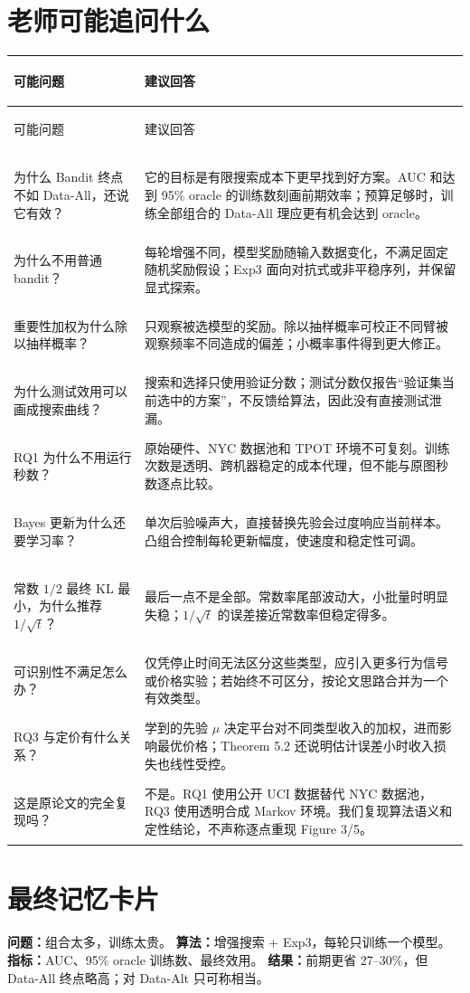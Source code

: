 \documentclass[11pt,a4paper]{ctexart}
\begin{document}
\section{老师可能追问什么}
\begin{longtable}{>{\bfseries\raggedright\arraybackslash}p{}>{\raggedright\arraybackslash}p{}}
\toprule
可能问题 & 建议回答\\
\midrule
\endfirsthead
\toprule
可能问题 & 建议回答\\
\midrule
\endhead
为什么 Bandit 终点不如 Data-All，还说它有效？ & 它的目标是有限搜索成本下更早找到好方案。AUC 和达到 95\% oracle 的训练数刻画前期效率；预算足够时，训练全部组合的 Data-All 理应更有机会达到 oracle。\\
为什么不用普通 bandit？ & 每轮增强不同，模型奖励随输入数据变化，不满足固定随机奖励假设；Exp3 面向对抗式或非平稳序列，并保留显式探索。\\
重要性加权为什么除以抽样概率？ & 只观察被选模型的奖励。除以抽样概率可校正不同臂被观察频率不同造成的偏差；小概率事件得到更大修正。\\
为什么测试效用可以画成搜索曲线？ & 搜索和选择只使用验证分数；测试分数仅报告“验证集当前选中的方案”，不反馈给算法，因此没有直接测试泄漏。\\
RQ1 为什么不用运行秒数？ & 原始硬件、NYC 数据池和 TPOT 环境不可复刻。训练次数是透明、跨机器稳定的成本代理，但不能与原图秒数逐点比较。\\
Bayes 更新为什么还要学习率？ & 单次后验噪声大，直接替换先验会过度响应当前样本。凸组合控制每轮更新幅度，使速度和稳定性可调。\\
常数 $1/2$ 最终 KL 最小，为什么推荐 $1/\sqrt t$？ & 最后一点不是全部。常数率尾部波动大，小批量时明显失稳；$1/\sqrt t$ 的误差接近常数率但稳定得多。\\
可识别性不满足怎么办？ & 仅凭停止时间无法区分这些类型，应引入更多行为信号或价格实验；若始终不可区分，按论文思路合并为一个有效类型。\\
RQ3 与定价有什么关系？ & 学到的先验 $\mu$ 决定平台对不同类型收入的加权，进而影响最优价格；Theorem 5.2 还说明估计误差小时收入损失也线性受控。\\
这是原论文的完全复现吗？ & 不是。RQ1 使用公开 UCI 数据替代 NYC 数据池，RQ3 使用透明合成 Markov 环境。我们复现算法语义和定性结论，不声称逐点重现 Figure 3/5。\\
\bottomrule
\end{longtable}

\section{最终记忆卡片}
\begin{tcolorbox}[colback=LightBlue,colframe=ZJUBlue,title=RQ1,fonttitle=\bfseries]
\textbf{问题：}组合太多，训练太贵。\quad
\textbf{算法：}增强搜索 + Exp3，每轮只训练一个模型。\quad
\textbf{指标：}AUC、95\% oracle 训练数、最终效用。\quad
\textbf{结果：}前期更省 27--30\%，但 Data-All 终点略高；对 Data-Alt 只可称相当。
\end{tcolorbox}
\end{document}
